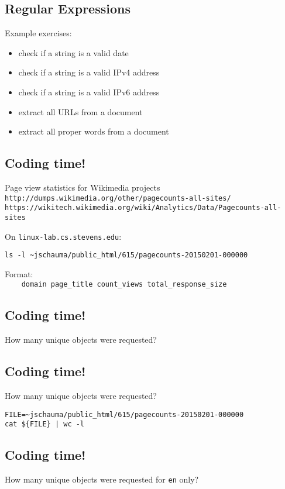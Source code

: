 \documentclass[xga]{xdvislides}
\begin{document}
\subsection{Regular Expressions}
Example exercises:
\begin{itemize}
	\item check if a string is a valid date
	\item check if a string is a valid IPv4 address
	\item check if a string is a valid IPv6 address
	\item extract all URLs from a document
	\item extract all proper words from a document
\end{itemize}

\subsection{Coding time!}
Page view statistics for Wikimedia projects \\
{\tt http://dumps.wikimedia.org/other/pagecounts-all-sites/} \\
{\tt https://wikitech.wikimedia.org/wiki/Analytics/Data/Pagecounts-all-sites} \\
\vspace{.5in}

On {\tt linux-lab.cs.stevens.edu}:
\begin{verbatim}
ls -l ~jschauma/public_html/615/pagecounts-20150201-000000
\end{verbatim}
\vspace{.5in}
Format: \\
\verb+    domain page_title count_views total_response_size+

\subsection{Coding time!}
How many unique objects were requested?

\subsection{Coding time!}
How many unique objects were requested?

\begin{verbatim}
FILE=~jschauma/public_html/615/pagecounts-20150201-000000
cat ${FILE} | wc -l
\end{verbatim}

\subsection{Coding time!}
How many unique objects were requested for {\tt en} only?
\end{document}
